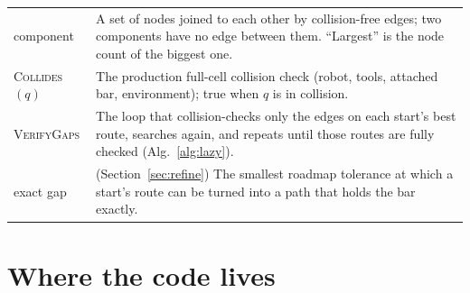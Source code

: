\documentclass[11pt,a4paper]{article}
\newcommand{\fn}[1]{\textsc{#1}}
\begin{document}
\begin{center}
\begin{tabular}{@{}>{\raggedright\arraybackslash}p{2.9cm} >{\raggedright\arraybackslash}p{13.0cm}@{}}
component & A set of nodes joined to each other by collision-free edges; two components have no edge between them. ``Largest'' is the node count of the biggest one. \\
\fn{Collides}$(q)$ & The production full-cell collision check (robot, tools, attached bar, environment); true when $q$ is in collision. \\
\fn{VerifyGaps} & The loop that collision-checks only the edges on each start's best route, searches again, and repeats until those routes are fully checked (Alg.~\ref{alg:lazy}). \\
exact gap & (Section~\ref{sec:refine}) The smallest roadmap tolerance at which a start's route can be turned into a path that holds the bar exactly. \\
\bottomrule
\end{tabular}
\end{center}

\section{Where the code lives}
\label{sec:where}
\end{document}
